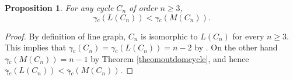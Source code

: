 \documentclass[a4paper,12pt, reqno]{amsart}
\newtheorem{Proposition}[Theorem]{Proposition}
\begin{document}
\begin{Proposition}\label{LCN<MCN}
For any cycle $C_n$ of order $n \geq 3$,
 $$\gamma{\tilde{}} _{c}(L(C_n)) < \gamma{\tilde{}} _{c}(M(C_n)).$$
\end{Proposition}
\begin{proof}
By definition of line graph, $C_n$ is isomorphic to $L(C_n)$ for every $n \geq 3$. This implies that $\gamma{\tilde{}} _{c}(C_n)=\gamma{\tilde{}} _{c}(L(C_n))=n-2$ by \cite{ocds}. On the other hand $\gamma{\tilde{}} _{c}(M(C_n))=n-1$ by Theorem \ref{theomoutdomcycle}, and hence $\gamma{\tilde{}} _{c}(L(C_n)) < \gamma{\tilde{}} _{c}(M(C_n)).$
\end{proof}
\end{document}
